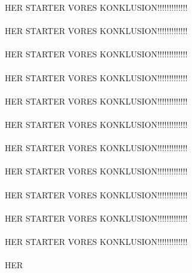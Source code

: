 HER STARTER VORES KONKLUSION!!!!!!!!!!!!!\\\\HER STARTER VORES KONKLUSION!!!!!!!!!!!!!\\\\HER STARTER VORES KONKLUSION!!!!!!!!!!!!!\\\\HER STARTER VORES KONKLUSION!!!!!!!!!!!!!\\\\HER STARTER VORES KONKLUSION!!!!!!!!!!!!!\\\\HER STARTER VORES KONKLUSION!!!!!!!!!!!!!\\\\HER STARTER VORES KONKLUSION!!!!!!!!!!!!!\\\\HER STARTER VORES KONKLUSION!!!!!!!!!!!!!\\\\HER STARTER VORES KONKLUSION!!!!!!!!!!!!!\\\\HER STARTER VORES KONKLUSION!!!!!!!!!!!!!\\\\HER STARTER VORES KONKLUSION!!!!!!!!!!!!!\\\\HER 
